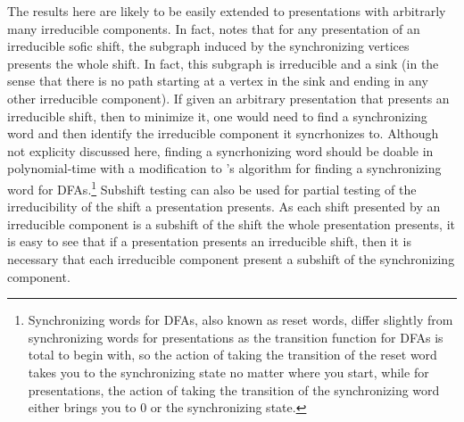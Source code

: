 \documentclass[hidelinks]{report}
\theoremstyle{definition}
\begin{document}
\begin{figure}[h]
    \centering

    \caption{}
    \label{notevenshift}
\end{figure}

The results here are likely to be easily extended to presentations with arbitrarly 
many irreducible components. In fact, \cite{jonoska1996sofic} notes that 
for any presentation of an irreducible sofic shift, the subgraph 
induced by the synchronizing vertices presents the whole shift. In 
fact, this subgraph is irreducible and a sink (in the sense that 
there is no path starting at a vertex in the sink and ending 
in any other irreducible component). If given 
an arbitrary presentation that presents an irreducible shift, then 
to minimize it, one would need to find a synchronizing word and then 
identify the irreducible component it syncrhonizes to. Although not 
explicity discussed here, finding a syncrhonizing word should be doable in 
polynomial-time with a modification to \cite{eppstein1990reset}'s algorithm for 
finding a synchronizing word for DFAs.\footnote{
    Synchronizing words for DFAs, also known as reset words, differ slightly  
    from synchronizing words for presentations as the transition function 
    for DFAs is total to begin with, so the action of 
    taking the transition of the reset word takes you to the synchronizing 
    state no matter where you start, while for presentations, the action 
    of taking the transition of the synchronizing word either brings you 
    to \(0\) or the synchronizing state.
} Subshift testing can also be used for partial testing of the irreducibility 
of the shift a presentation presents. 
As each shift presented by an irreducible component is a subshift 
of the shift the whole presentation presents, it is easy to see that 
if a presentation presents an irreducible shift, then it is 
necessary that each irreducible component present a subshift of the 
synchronizing component. 
\end{document}
